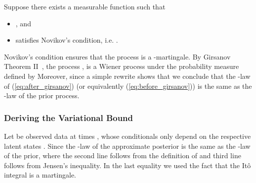 \documentclass[twoside]{article}
\begin{document}
Suppose there exists a measurable function  such that 
\begin{itemize}
    \item , and
    \item  satisfies Novikov's condition, i.e. 
            .
\end{itemize}
Novikov's condition ensures that the process
is a -martingale. By Girsanov Theorem II~\cite[Theorem 8.6.4]{oksendal2013stochastic}, the process
,  is a Wiener process under the probability measure  defined by 
Moreover, since a simple rewrite shows that 
we conclude that the -law of (\ref{eq:after_girsanov}) (or equivalently (\ref{eq:before_girsanov})) is the same as the -law of the prior process. 

\subsubsection{Deriving the Variational Bound}
Let  be observed data at times , whose conditionals only depend on the respective latent states . 
Since the -law of the approximate posterior is the same as the -law of the prior,
where the second line follows from the definition of  and third line follows from Jensen's inequality. In the last equality we used the fact that the It\^{o} integral  is a martingale.
\end{document}
